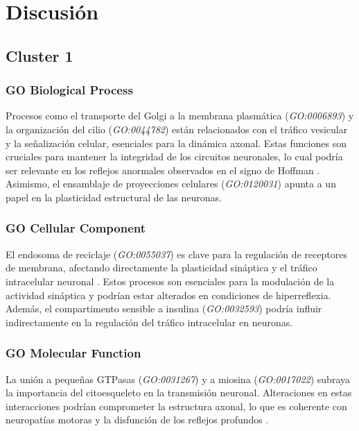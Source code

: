 \section{Discusión}
\subsection{Cluster 1}

\subsubsection{GO Biological Process}

Procesos como el transporte del Golgi a la membrana plasmática (\textit{GO:0006893}) y la organización del cilio (\textit{GO:0044782}) están relacionados con el tráfico vesicular y la señalización celular, esenciales para la dinámica axonal. Estas funciones son cruciales para mantener la integridad de los circuitos neuronales, lo cual podría ser relevante en los reflejos anormales observados en el signo de Hoffman \cite{cells11182773}. Asimismo, el ensamblaje de proyecciones celulares (\textit{GO:0120031}) apunta a un papel en la plasticidad estructural de las neuronas.

\subsubsection{GO Cellular Component}

El endosoma de reciclaje (\textit{GO:0055037}) es clave para la regulación de receptores de membrana, afectando directamente la plasticidad sináptica y el tráfico intracelular neuronal \cite{RozesSalvador2020}. Estos procesos son esenciales para la modulación de la actividad sináptica y podrían estar alterados en condiciones de hiperreflexia. Además, el compartimento sensible a insulina (\textit{GO:0032593}) podría influir indirectamente en la regulación del tráfico intracelular en neuronas.

\subsubsection{GO Molecular Function}

La unión a pequeñas GTPasas (\textit{GO:0031267}) y a miosina (\textit{GO:0017022}) subraya la importancia del citoesqueleto en la transmisión neuronal. Alteraciones en estas interacciones podrían comprometer la estructura axonal, lo que es coherente con neuropatías motoras y la disfunción de los reflejos profundos \cite{GUO2020133}.

